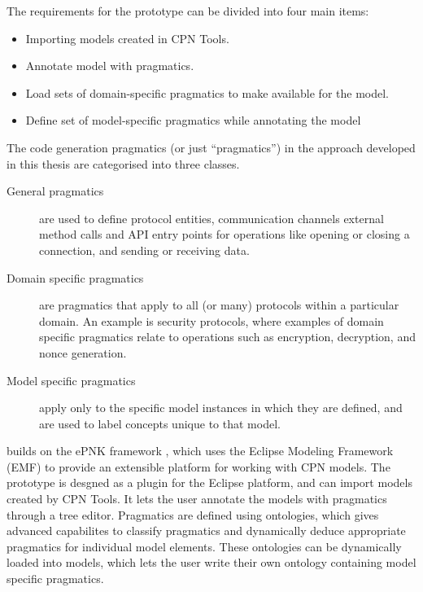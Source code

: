 The requirements for the prototype can be divided into four main items:

\begin{itemize} 
	\item Importing models created in CPN Tools. 

	\item Annotate model with pragmatics. 
		
	\item Load sets of domain-specific pragmatics to make available for the model.
	
	\item Define set of model-specific pragmatics while annotating the model

\end{itemize}

The code generation pragmatics (or just ``pragmatics'') in the approach
developed in this thesis are categorised into three classes.
\begin{description}
	\item[General pragmatics] are used to define protocol entities, communication
	channels external method calls and API entry points for operations like opening
	or closing a connection, and sending or receiving data.
	\item[Domain specific pragmatics] are pragmatics that apply to all (or many)
	protocols within a particular domain. An example is security protocols, where
	examples of domain specific pragmatics relate to operations such as
	encryption, decryption, and nonce generation.
	\item[Model specific pragmatics] apply only to the specific model instances in
	which they are defined, and are used to label concepts unique to that model. 
\end{description}

\thename{} builds on the ePNK framework \cite{kindler2011epnk}, which uses the
Eclipse Modeling Framework (EMF) to provide an extensible platform for working with CPN models. The
prototype is desgned as a plugin for the Eclipse platform, and can import models
created by CPN Tools. It lets the user annotate the models with pragmatics through a tree
editor. Pragmatics are defined using ontologies, which gives advanced
capabilites to classify pragmatics and dynamically deduce appropriate
pragmatics for individual model elements. These ontologies can be dynamically
loaded into models, which lets the user write their own ontology containing
model specific pragmatics.

